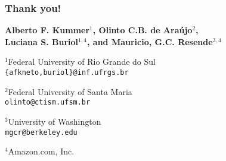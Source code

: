 \documentclass[aspectratio=169]{beamer}
\begin{document}
\begin{frame}
   \frametitle{Thank you!}
   \begin{center}
      \footnotesize
      \textbf{Alberto F. Kummer$^1$, Olinto C.B. de Araújo$^2$,\\Luciana S. Buriol$^{1,4}$, and Mauricio, G.C. Resende$^{3,4}$}

      \vspace*{8pt}

      $^1$Federal University of Rio Grande do Sul\\
      \texttt{\{\textcolor{InfRed}{afkneto},buriol\}@inf.ufrgs.br}
      \vspace*{6pt}

      $^2$Federal University of Santa Maria\\
      \texttt{olinto@ctism.ufsm.br}
      \vspace*{6pt}

      $^3$University of Washington\\
      \texttt{mgcr@berkeley.edu}
      \vspace*{6pt}

      $^4$Amazon.com, Inc.
   \end{center}

\end{frame}
\end{document}
